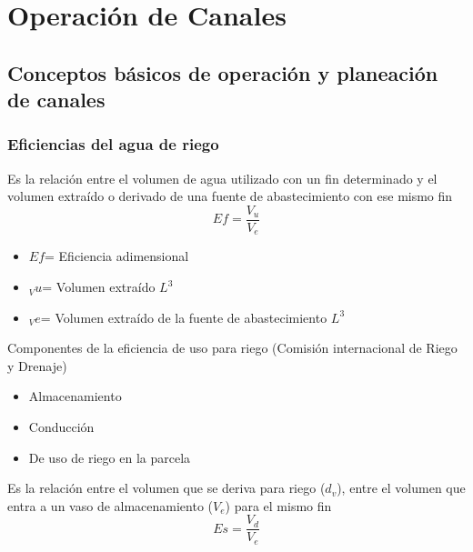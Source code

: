 \chapter{Operación de Canales}
\section{Conceptos básicos de operación y planeación de canales}
\subsection{Eficiencias del agua de riego}
\begin{definition}
    Es la relación entre el volumen de agua utilizado con un fin determinado y el volumen extraído o derivado de una fuente de abastecimiento con ese mismo fin
    \begin{equation}
        Ef = \frac{V_u}{V_e}
    \end{equation}
    \begin{notation}
        \begin{itemize}
            \item $Ef$= Eficiencia adimensional
            \item $_Vu$= Volumen extraído $L^3$
            \item $_Ve$= Volumen extraído de la fuente de abastecimiento $L^3$
        \end{itemize}
    \end{notation}
\end{definition}
Componentes de la eficiencia de uso para riego (Comisión internacional de Riego y Drenaje)
\begin{itemize}
    \item Almacenamiento
    \item Conducción
    \item De uso de riego en la parcela
\end{itemize}
\begin{definition}
    Es la relación entre el volumen que se deriva para riego ($d_v$), entre el volumen que entra a un vaso de almacenamiento ($V_e$) para el mismo fin
    \begin{equation}
        Es = \frac{V_d}{V_e}
    \end{equation}
\end{definition}
